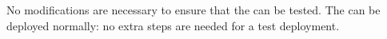 No modifications are necessary to ensure that the \gdaut{} can be tested. The \gdaut{} can be deployed normally: no extra steps are needed for a test deployment.
